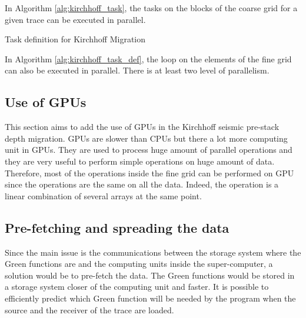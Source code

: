 In Algorithm \ref{alg:kirchhoff_task}, the tasks on the blocks of the coarse grid for a given trace can be executed in parallel.

\begin{algorithm}[h]
	\DontPrintSemicolon
	\SetAlgoVlined
	\caption{Task definition for Kirchhoff Migration \label{alg:kirchhoff_task_def}}

\end{algorithm}

In Algorithm \ref{alg:kirchhoff_task_def}, the loop on the elements of the fine grid can also be executed in parallel.
There is at least two level of parallelism.


\subsection{Use of GPUs}
This section aims to add the use of GPUs in the Kirchhoff seismic pre-stack depth migration.
GPUs are slower than CPUs but there a lot more computing unit in GPUs.
They are used to process huge amount of parallel operations and they are very useful to perform simple operations on huge amount of data.
Therefore, most of the operations inside the fine grid can be performed on GPU since the operations are the same on all the data.
Indeed, the operation is a linear combination of several arrays at the same point.

\subsection{Pre-fetching and spreading the data}
Since the main issue is the communications between the storage system where the Green functions are and the computing units inside the super-computer, a solution would be to pre-fetch the data.
The Green functions would be stored in a storage system closer of the computing unit and faster.
It is possible to efficiently predict which Green function will be needed by the program when the source and the receiver of the trace are loaded.

